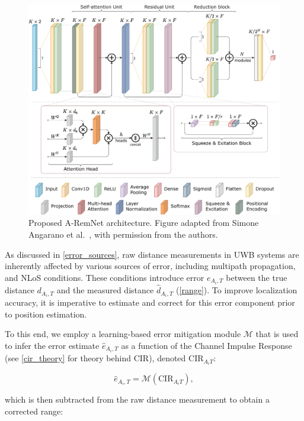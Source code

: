 \begin{figure}[tbh]
\includegraphics[width=\textwidth]{Graphics/remnet_compat.pdf}
\centering
\caption[Proposed A-RemNet architecture.]{Proposed A-RemNet architecture. Figure adapted from Simone Angarano et al.~\cite{Simone2021UWB}, with permission from the authors.}
\label{fig:architecture}
\end{figure}

As discussed in \autoref{error_sources}, raw distance measurements in UWB systems are inherently affected by various sources of error, including multipath propagation, and NLoS conditions. These conditions introduce error $e_{A_i,T}$ between the true distance $d_{A_i,T}$ and the measured distance $\hat{d}_{A_i,T}$ (\autoref{range}). To improve localization accuracy, it is imperative to estimate and correct for this error component prior to position estimation. 

To this end, we employ a learning-based error mitigation module $\mathcal{M}$ that is used to infer the error estimate $\hat{e}_{A_i,T}$ as a function of the Channel Impulse Response (see \autoref{cir_theory} for theory behind CIR), denoted $\text{CIR}_{A_iT}$:

\begin{equation}
    \hat{e}_{A_i,T} = \mathcal{M}(\text{CIR}_{A_iT}),
\end{equation}

which is then subtracted from the raw distance measurement to obtain a corrected range:

